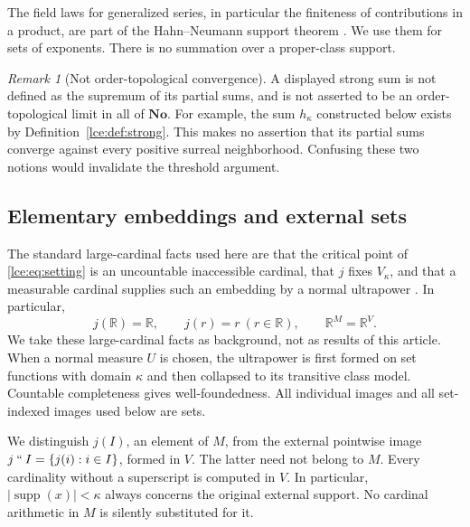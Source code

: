 \documentclass[11pt,letterpaper]{article}
\numberwithin{equation}{section}
\theoremstyle{definition}
\theoremstyle{remark}
\newtheorem{remark}[theorem]{Remark}
\newcommand{\No}{\mathbf{No}}
\newcommand{\R}{\mathbb R}
\newcommand{\supp}{\operatorname{supp}}
\newcommand{\imset}[2]{#1\mathbin{``}#2}
\newcommand{\abs}[1]{\lvert#1\rvert}
\begin{document}
The field laws for generalized series, in particular the finiteness of
contributions in a product, are part of the Hahn--Neumann support theorem
\cite{Gonshor,vdDE,KKS}. We use them for sets of exponents. There is no
summation over a proper-class support.

\begin{remark}[Not order-topological convergence]\label{lce:rem:topology}
A displayed strong sum is not defined as the supremum of its partial sums,
and is not asserted to be an order-topological limit in all of $\No$.
For example, the sum $h_\kappa$ constructed below exists by
Definition~\ref{lce:def:strong}. This makes no assertion that its partial sums
converge against every positive surreal neighborhood. Confusing these two
notions would invalidate the threshold argument.
\end{remark}

\subsection{Elementary embeddings and external sets}
The standard large-cardinal facts used here are that the critical point of
\eqref{lce:eq:setting} is an uncountable inaccessible cardinal, that $j$ fixes
$V_\kappa$, and that a measurable cardinal supplies such an embedding by a
normal ultrapower \cite{Neeman}. In particular,
\begin{equation}\label{lce:eq:fixedcoeff}
 j(\R)=\R,\qquad j(r)=r\ (r\in\R),\qquad \R^M=\R^V.
\end{equation}
We take these large-cardinal facts as background, not as results of this
article. When a normal measure $U$ is chosen, the ultrapower is first formed
on set functions with domain $\kappa$ and then collapsed to its transitive
class model. Countable completeness gives well-foundedness. All individual
images and all set-indexed images used below are sets.

We distinguish $j(I)$, an element of $M$, from the external pointwise image
$\imset jI=\{j(i):i\in I\}$, formed in $V$. The latter need not belong to
$M$. Every cardinality without a superscript is computed in $V$. In
particular, $\abs{\supp(x)}<\kappa$ always concerns the original external
support. No cardinal arithmetic in $M$ is silently substituted for it.
\end{document}
